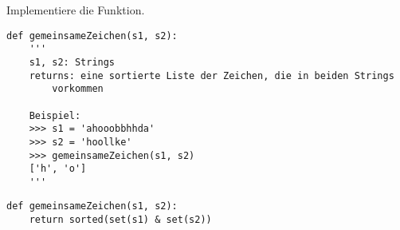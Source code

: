 \question[4] Implementiere die Funktion.
\begin{lstlisting}
def gemeinsameZeichen(s1, s2):
    '''
    s1, s2: Strings
    returns: eine sortierte Liste der Zeichen, die in beiden Strings
        vorkommen

    Beispiel:
    >>> s1 = 'ahooobbhhda'
    >>> s2 = 'hoollke'
    >>> gemeinsameZeichen(s1, s2)
    ['h', 'o']
    '''
\end{lstlisting}
\begin{solutionbox}{4cm}
\begin{lstlisting}
def gemeinsameZeichen(s1, s2):
    return sorted(set(s1) & set(s2))
\end{lstlisting}
\end{solutionbox}
